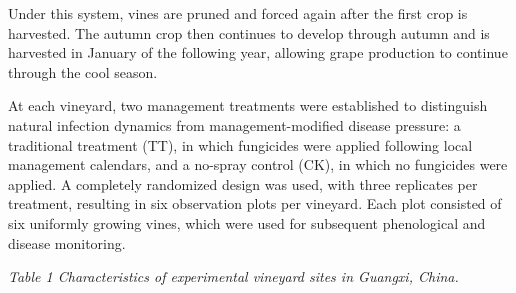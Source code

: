 \documentclass{article}
\newcommand{\manualcaption}[1]{%
  \begin{center}%
  \fontsize{10}{12}\selectfont\itshape #1%
  \end{center}%
}
\begin{document}
Under this system, vines are pruned and forced again after the first crop
is harvested. The autumn crop then continues to develop through autumn and
is harvested in January of the following year, allowing grape production to
continue through the cool season.

At each vineyard, two management treatments were established to
distinguish natural infection dynamics from management-modified disease
pressure: a traditional treatment (TT), in which fungicides were applied
following local management calendars, and a no-spray control (CK), in
which no fungicides were applied. A completely randomized design was
used, with three replicates per treatment, resulting in six observation
plots per vineyard. Each plot consisted of six uniformly growing vines,
which were used for subsequent phenological and disease monitoring.

\protect{}\label{_Ref222580265}{}
\manualcaption{Table 1 Characteristics of experimental vineyard sites in Guangxi, China.}
\end{document}

